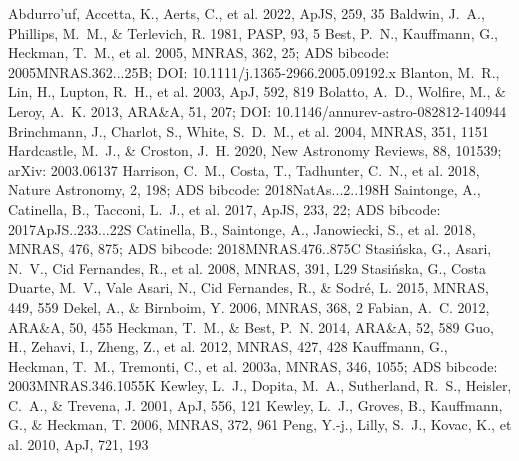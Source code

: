 \documentclass[twocolumn]{aastex631}
\begin{document}
\begin{thebibliography}{}
 Abdurro'uf, Accetta, K., Aerts, C., et al. 2022, ApJS, 259, 35
 Baldwin, J.~A., Phillips, M.~M., \& Terlevich, R. 1981, PASP, 93, 5
 Best, P.~N., Kauffmann, G., Heckman, T.~M., et al. 2005, MNRAS, 362, 25; ADS bibcode: 2005MNRAS.362...25B; DOI: 10.1111/j.1365-2966.2005.09192.x
 Blanton, M.~R., Lin, H., Lupton, R.~H., et al. 2003, ApJ, 592, 819
 Bolatto, A.~D., Wolfire, M., \& Leroy, A.~K. 2013, ARA\&A, 51, 207; DOI: 10.1146/annurev-astro-082812-140944
 Brinchmann, J., Charlot, S., White, S.~D.~M., et al. 2004, MNRAS, 351, 1151
 Hardcastle, M.~J., \& Croston, J.~H. 2020, New Astronomy Reviews, 88, 101539; arXiv: 2003.06137
 Harrison, C.~M., Costa, T., Tadhunter, C.~N., et al. 2018, Nature Astronomy, 2, 198; ADS bibcode: 2018NatAs...2..198H
 Saintonge, A., Catinella, B., Tacconi, L.~J., et al. 2017, ApJS, 233, 22; ADS bibcode: 2017ApJS..233...22S
 Catinella, B., Saintonge, A., Janowiecki, S., et al. 2018, MNRAS, 476, 875; ADS bibcode: 2018MNRAS.476..875C
 Stasi{\'n}ska, G., Asari, N.~V., Cid Fernandes, R., et al. 2008, MNRAS, 391, L29
 Stasi{\'n}ska, G., Costa Duarte, M.~V., Vale Asari, N., Cid Fernandes, R., \& Sodr{\'e}, L. 2015, MNRAS, 449, 559
 Dekel, A., \& Birnboim, Y. 2006, MNRAS, 368, 2
 Fabian, A.~C. 2012, ARA\&A, 50, 455
 Heckman, T.~M., \& Best, P.~N. 2014, ARA\&A, 52, 589
 Guo, H., Zehavi, I., Zheng, Z., et al. 2012, MNRAS, 427, 428
 Kauffmann, G., Heckman, T.~M., Tremonti, C., et al. 2003a, MNRAS, 346, 1055; ADS bibcode: 2003MNRAS.346.1055K
 Kewley, L.~J., Dopita, M.~A., Sutherland, R.~S., Heisler, C.~A., \& Trevena, J. 2001, ApJ, 556, 121
 Kewley, L.~J., Groves, B., Kauffmann, G., \& Heckman, T. 2006, MNRAS, 372, 961
 Peng, Y.-j., Lilly, S.~J., Kovac, K., et al. 2010, ApJ, 721, 193

\end{thebibliography}
\end{document}

